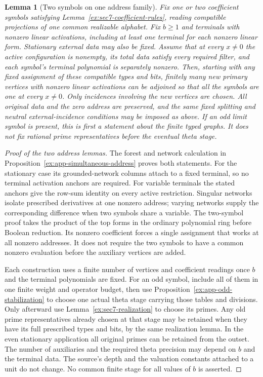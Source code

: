 \documentclass[11pt]{article}
\newtheorem{lemma}[theorem]{Lemma}
\theoremstyle{definition}
\theoremstyle{remark}
\begin{document}
\begin{lemma}[Two symbols on one address family]\label{ex:sec7-two-symbol-address}
Fix one or two coefficient symbols satisfying
Lemma~\ref{ex:sec7-coefficient-rules}, reading compatible projections
of one common realizable alphabet. Fix $b\ge1$ and terminals with
nonzero linear activations, including at least one terminal for each
nonzero linear form. Stationary external data may also be fixed.
Assume that at every $x\ne0$ the active configuration is nonempty,
its total data satisfy every required filter, and each symbol's
terminal polynomial is separately nonzero.
Then, starting with any fixed assignment of these compatible types
and bits, finitely many new primary vertices with nonzero linear activations can be
adjoined so that all the symbols are one at every $x\ne0$.
Only incidences involving the new vertices are chosen. All original
data and the zero address are preserved, and the same fixed splitting
and neutral external-incidence conditions may be imposed as above.
If an odd limit symbol is present, this is first a statement about
the finite typed graphs. It does not fix rational prime representatives
before the eventual theta stage.
\end{lemma}
\begin{proof}[Proof of the two address lemmas]
The forest and network calculation in
Proposition~\ref{ex:app-simultaneous-address} proves both statements.
For the stationary case its grounded-network columns attach to a
fixed terminal, so no terminal activation anchors are required.
For variable terminals the stated anchors give the row-sum identity
on every active restriction. Singular networks isolate prescribed
derivatives at one nonzero address; varying networks supply the
corresponding difference when two symbols share a variable. The
two-symbol proof takes the product of the top forms in the ordinary
polynomial ring before Boolean reduction. Its nonzero coefficient
forces a single assignment that works at all nonzero addresses.
It does not require the two symbols to have a common nonzero
evaluation before the auxiliary vertices are added.

Each construction uses a finite number of vertices and coefficient
readings once $b$ and the terminal polynomials are fixed. For an odd
symbol, include all of them in one finite weight and operator budget,
then use Proposition~\ref{ex:app-odd-stabilization} to choose one actual
theta stage carrying those tables and divisions. Only afterward use
Lemma~\ref{ex:sec7-realization} to choose its primes. Any old
prime representatives already chosen at that stage may be retained
when they have its full prescribed types and bits, by the same
realization lemma. In the even stationary application all original
primes can be retained from the outset. The number of
auxiliaries and the required theta precision may depend on $b$ and
the terminal data. The source's depth and the valuation constants
attached to a unit do not change. No common finite stage for all
values of $b$ is asserted.
\end{proof}
\end{document}
